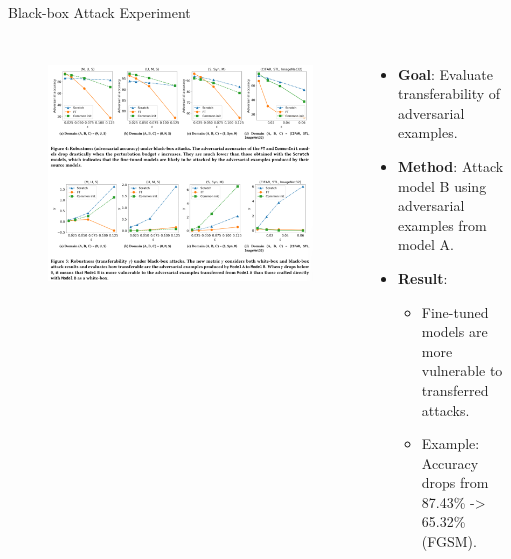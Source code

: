 \begin{frame}{Black-box Attack Experiment}
\begin{columns}[T]
       \begin{figure}[h]
           \centering
           \includegraphics[scale=0.5]{img/black-box.png}
           \label{fig:black-box}
       \end{figure}
        \begin{itemize}
            \item \textbf{Goal}: Evaluate transferability of adversarial examples.
            \item \textbf{Method}: Attack model B using adversarial examples from model A.
            \item \textbf{Result}:
            \begin{itemize}
                \item Fine-tuned models are more vulnerable to transferred attacks.
                \item Example: Accuracy drops from 87.43\% -> 65.32\% (FGSM).
            \end{itemize}
        \end{itemize}
\end{columns}
\end{frame}

